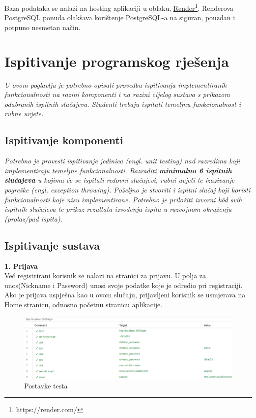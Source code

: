 			 Baza podataka se nalazi na hosting aplikaciji u oblaku, \underline{Render}\footnote{https://render.com/}. Renderova PostgreSQL ponuda olakšava korištenje PostgreSQL-a na siguran, pouzdan i potpuno nesmetan način.\\
			 			
			\eject 
		
	
		\section{Ispitivanje programskog rješenja}
			
			
			 \textit{U ovom poglavlju je potrebno opisati provedbu ispitivanja implementiranih funkcionalnosti na razini komponenti i na razini cijelog sustava s prikazom odabranih ispitnih slučajeva. Studenti trebaju ispitati temeljnu funkcionalnost i rubne uvjete.}
	
			
			\subsection{Ispitivanje komponenti}
			\textit{Potrebno je provesti ispitivanje jedinica (engl. unit testing) nad razredima koji implementiraju temeljne funkcionalnosti. Razraditi \textbf{minimalno 6 ispitnih slučajeva} u kojima će se ispitati redovni slučajevi, rubni uvjeti te izazivanje pogreške (engl. exception throwing). Poželjno je stvoriti i ispitni slučaj koji koristi funkcionalnosti koje nisu implementirane. Potrebno je priložiti izvorni kôd svih ispitnih slučajeva te prikaz rezultata izvođenja ispita u razvojnom okruženju (prolaz/pad ispita). }
			
			
			
			\subsection{Ispitivanje sustava}
			 
			\textbf{1. Prijava}\\
				
				Već registrirani korisnik se nalazi na stranici za prijavu. U polja za unos(Nickname i Password) unosi svoje podatke koje je odredio pri registraciji. Ako je prijava uspješna kao u ovom slučaju, prijavljeni korisnik se usmjerava na Home stranicu, odnosno početnu stranicu aplikacije.
				
				\begin{figure}[H]
					\includegraphics[width=\textwidth]{slike/UspjesnaPrijava1.PNG} 
					\caption{Postavke testa}
					\label{fig:UspjesnaPrijava1}
				\end{figure}

